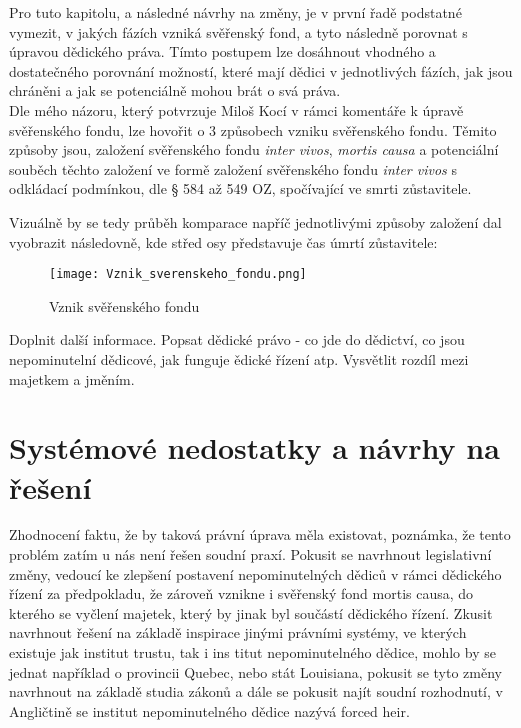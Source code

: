\documentclass{article}
\begin{document}
Pro tuto kapitolu, a následné návrhy na změny, je v první řadě podstatné vymezit,  v jakých fázích vzniká svěřenský fond, a tyto následně porovnat s úpravou dědického práva. Tímto postupem lze dosáhnout vhodného a dostatečného porovnání možností, které mají dědici v jednotlivých fázích, jak jsou chráněni a jak se potenciálně mohou brát o svá práva. \\ 

Dle mého názoru, který potvrzuje Miloš Kocí v rámci komentáře k úpravě svěřenského fondu, lze hovořit o 3 způsobech vzniku svěřenského fondu. Těmito způsoby jsou, založení svěřenského fondu \textit{inter vivos}, \textit{mortis causa} a potenciální souběch těchto založení ve formě založení svěřenského fondu \textit{inter vivos} s odkládací podmínkou, dle § 584 až 549 OZ, spočívající ve smrti zůstavitele. \\

\newpage

\thispagestyle{smallertextinheader}

Vizuálně by se tedy průběh komparace napříč jednotlivými způsoby založení dal vyobrazit následovně, kde střed osy představuje čas úmrtí zůstavitele:

\begin{figure}[h]
\centering
\texttt{[image: Vznik\_sverenskeho\_fondu.png]}
\caption{Vznik svěřenského fondu}
\label{fig:komparace}
\end{figure}

Doplnit další informace.
Popsat dědické právo - co jde do dědictví, co jsou nepominutelní dědicové, jak funguje ědické řízení atp.
Vysvětlit rozdíl mezi majetkem a jměním.

\newpage

\section{Systémové nedostatky a návrhy na řešení}

Zhodnocení faktu, že by taková právní úprava měla existovat, poznámka, že tento problém zatím u nás není řešen soudní praxí. Pokusit se navrhnout legislativní změny, vedoucí ke zlepšení postavení nepominutelných dědiců v rámci dědického řízení za předpokladu, že zároveň vznikne i svěřenský fond mortis causa, do kterého se vyčlení majetek, který by jinak byl součástí dědického řízení. Zkusit navrhnout řešení na základě inspirace jinými právními systémy, ve kterých existuje jak institut trustu, tak i ins  titut nepominutelného dědice, mohlo by se jednat například o provincii Quebec, nebo stát Louisiana, pokusit se tyto změny navrhnout na základě studia zákonů a dále se pokusit najít soudní rozhodnutí, v Angličtině se institut nepominutelného dědice nazývá forced heir. \\
\end{document}
